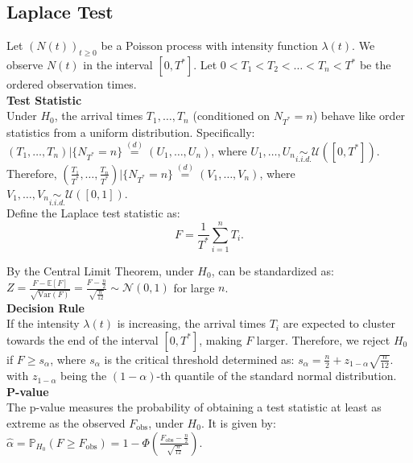 \documentclass{journalstyle}
\begin{document}
\subsection{Laplace Test}

Let $(N(t))_{t \geq 0}$ be a Poisson process with intensity function $\lambda(t)$.
We observe $N(t)$ in the interval $[0, T^*]$.
Let $0 < T_1 < T_2 < \ldots < T_n < T^*$ be the ordered observation times. \\

\noindent\textbf{Test Statistic} \\
Under $H_0$, the arrival times $T_1, \ldots, T_n$ (conditioned on $N_{T^*} = n$) behave like order statistics from a uniform distribution.
Specifically: \\
$(T_1, \ldots, T_n) | \{N_{T^*} = n\} \overset{(d)}{=} (U_1, \ldots, U_n)$, where $U_1, \ldots, U_n \underset{i.i.d.}{\sim} \mathcal{U}([0, T^*])$. \\
Therefore, $(\frac{T_1}{T^*}, \ldots, \frac{T_n}{T^*}) | \{N_{T^*} = n\} \overset{(d)}{=} (V_1, \ldots, V_n)$, where $V_1, \ldots, V_n \underset{i.i.d.}{\sim} \mathcal{U}([0, 1])$. \\
Define the Laplace test statistic as: 
\begin{equation}
    F = \frac{1}{T^*} \sum_{i=1}^n T_i.
    \label{eq:laplace_test_statistic}
\end{equation}

By the Central Limit Theorem, under $H_0$,  can be standardized as: 
$Z = \frac{F - \mathbb{E}[F]}{\sqrt{\text{Var}(F)}} = \frac{F - \frac{n}{2}}{\sqrt{\frac{n}{12}}} \sim \mathcal{N}(0, 1)$
for large $n$. \\

\noindent\textbf{Decision Rule} \\
If the intensity $\lambda(t)$ is increasing, the arrival times $T_i$ are expected to cluster towards the end of the interval $[0, T^*]$, making $F$ larger.
Therefore, we reject $H_0$ if $F \geq s_{\alpha}$, where $s_{\alpha}$ is the critical threshold determined as: $s_{\alpha} = \frac{n}{2} + z_{1 - \alpha} \sqrt{\frac{n}{12}}$. \\
with $z_{1 - \alpha}$ being the $(1 - \alpha)$-th quantile of the standard normal distribution. \\

\noindent\textbf{P-value} \\
The p-value measures the probability of obtaining a test statistic at least as extreme as the observed $F_{\text{obs}}$, under $H_0$.
It is given by: \\
$\hat{\alpha} = \mathbb{P}_{H_0}(F \geq F_{\text{obs}}) = 1 - \Phi(\frac{F_{\text{obs}} - \frac{n}{2}}{\sqrt{\frac{n}{12}}})$. \\
\end{document}

